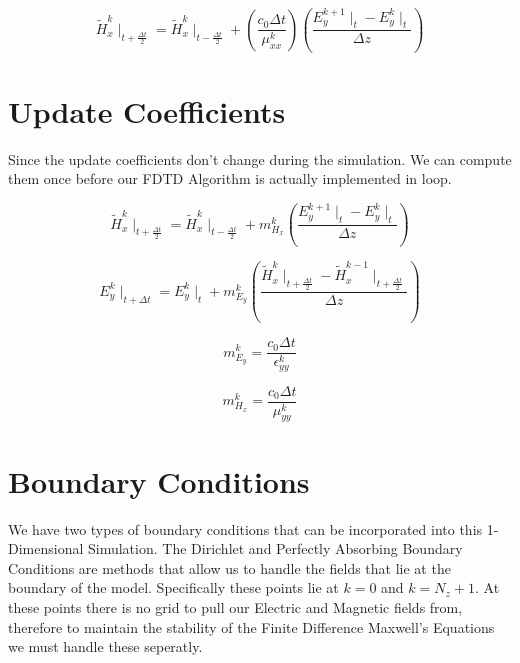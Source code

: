 \documentclass[a4paper,10pt]{article}
\begin{document}
\begin{equation}
  \tilde{H}_{x}^{k}\mid_{t+\frac{\Delta t}{2}} = \tilde{H}_{x}^{k}\mid_{t-\frac{\Delta t}{2}} + \left(\frac{c_0\Delta t}{\mu_{xx}^{k}}\right)\left(\frac{E_{y}^{k+1}\mid_{t} - E_{y}^{k}\mid_{t}}{\Delta z}\right)
\end{equation}

\section{Update Coefficients}

Since the update coefficients don't change during the simulation.  We can compute them once before our FDTD Algorithm is actually implemented in loop.

\begin{equation}
  \tilde{H}_{x}^{k}\mid_{t+\frac{\Delta t}{2}} = \tilde{H}_{x}^{k}\mid_{t-\frac{\Delta t}{2}} + m_{H_x}^{k}\left(\frac{E_{y}^{k+1}\mid_{t} - E_{y}^{k}\mid_{t}}{\Delta z}\right)
\end{equation}

\begin{equation}
  E_{y}^{k}\mid_{t+\Delta t} = E_{y}^{k}\mid_{t} + m_{E_y}^{k}\left(\frac{\tilde{H}_{x}^{k}\mid_{t+\frac{\Delta t}{2}} - \tilde{H}_{x}^{k-1}\mid_{t+\frac  {\Delta t}{2}}}{\Delta z}\right)
\end{equation}


\begin{equation}
  m_{E_y}^{k} = \frac{c_0 \Delta t}{\epsilon_{yy}^{k}}
\end{equation}

\begin{equation}
   m_{H_x}^{k} = \frac{c_0 \Delta t}{\mu_{yy}^{k}}
\end{equation}



\section{Boundary Conditions}
We have two types of boundary conditions that can be incorporated into this 1-Dimensional Simulation.  The Dirichlet and Perfectly Absorbing Boundary Conditions are methods that allow us to handle the fields that lie at the boundary of the model.  Specifically these points lie at $k = 0$ and $k = N_z+1$.  At these points there is no grid to pull our Electric and Magnetic fields from, therefore to maintain the stability of the Finite Difference Maxwell's Equations we must handle these seperatly.
\end{document}
